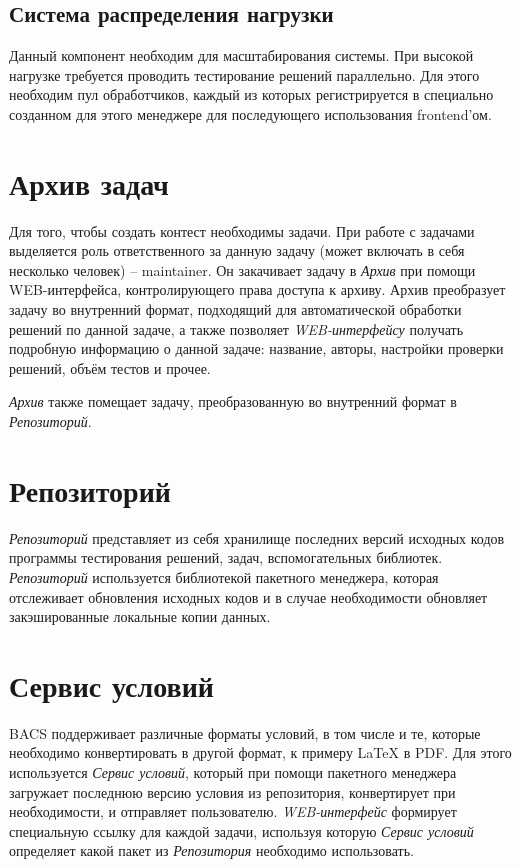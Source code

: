\subsection{Система распределения нагрузки}
Данный компонент необходим для масштабирования системы.
При высокой нагрузке требуется проводить тестирование решений параллельно.
Для этого необходим пул обработчиков, каждый из которых регистрируется в специально
созданном для этого менеджере для последующего использования frontend'ом.

\section{Архив задач}
Для того, чтобы создать контест необходимы задачи.
При работе с задачами выделяется роль ответственного за данную задачу (может включать в себя
несколько человек) -- maintainer. Он закачивает задачу в \textit{Архив} при помощи WEB-интерфейса,
контролирующего права доступа к архиву. Архив преобразует задачу во внутренний формат,
подходящий для автоматической обработки решений по данной задаче, а также позволяет
\textit{WEB-интерфейсу} получать подробную информацию о данной задаче:
название, авторы, настройки проверки решений, объём тестов и прочее.

\textit{Архив} также помещает задачу, преобразованную во внутренний формат в \textit{Репозиторий}.

\section{Репозиторий}
\textit{Репозиторий} представляет из себя хранилище последних версий исходных кодов
программы тестирования решений, задач, вспомогательных библиотек.
\textit{Репозиторий} используется библиотекой пакетного менеджера,
которая отслеживает обновления исходных кодов и в случае необходимости
обновляет закэшированные локальные копии данных.

\section{Сервис условий}
BACS поддерживает различные форматы условий, в том числе и те, которые необходимо
конвертировать в другой формат, к примеру LaTeX в PDF. Для этого используется
\textit{Сервис условий}, который при помощи пакетного менеджера загружает последнюю
версию условия из репозитория, конвертирует при необходимости,
и отправляет пользователю. \textit{WEB-интерфейс} формирует специальную ссылку
для каждой задачи, используя которую \textit{Сервис условий} определяет
какой пакет из \textit{Репозитория} необходимо использовать.

